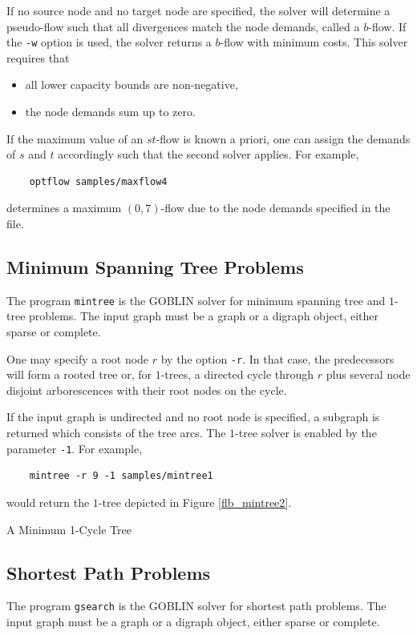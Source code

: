 \documentclass[a4paper,11pt,twoside]{book}
\begin{document}
\begin{multicols}{2}
If no source node and no target node are specified, the solver will determine
a pseudo-flow such that all divergences match the node demands, called a
$b$-flow. If the \verb/-w/ option is used, the solver returns a $b$-flow with
minimum costs.  This solver requires that
\begin{itemize}
\item all lower capacity bounds are non-negative,
\item the node demands sum up to zero.
\end{itemize}
If the maximum value of an $st$-flow is known a priori, one can assign
the demands of $s$ and $t$ accordingly such that the second solver applies.
For example,
\begin{verbatim}
    optflow samples/maxflow4
\end{verbatim}
determines a maximum $(0,7)$-flow due to the node demands specified in the file.


\subsection{Minimum Spanning Tree Problems}
The program \verb/mintree/ is the GOBLIN solver for minimum spanning tree and
$1$-tree problems. The input graph must be a graph or a digraph object, either
sparse or complete.

One may specify a root node $r$ by the option \verb/-r/. In that case, the
predecessors will form a rooted tree or, for $1$-trees, a directed cycle
through $r$ plus several node disjoint arborescences with their root nodes on
the cycle.

If the input graph is undirected and no root node is specified, a subgraph is
returned which consists of the tree arcs. The $1$-tree solver is enabled by
the parameter \verb/-1/. For example,
\begin{verbatim}
    mintree -r 9 -1 samples/mintree1
\end{verbatim}
would return the $1$-tree depicted in Figure \ref{flb_mintree2}.

\bigskip
\begin{figurehere}
\begin{center}
\epsfxsize=8cm
\vspace{0.5cm}
\caption{\label{flb_mintree2}A Minimum 1-Cycle Tree}
\end{center}
\end{figurehere}


\subsection{Shortest Path Problems}
The program \verb/gsearch/ is the GOBLIN solver for shortest path problems.
The input graph must be a graph or a digraph object, either sparse or complete.


\end{multicols}
\end{document}
